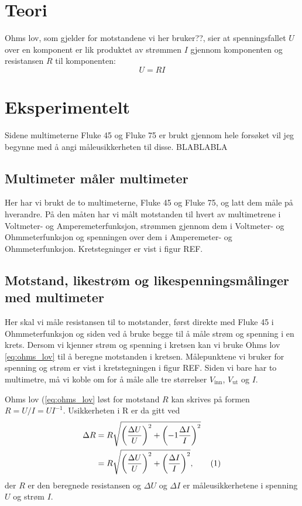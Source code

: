 \documentclass[reprint, english,notitlepage]{revtex4-1}  %
\newcommand\numberthis{\addtocounter{equation}{1}\tag{\theequation}}
\begin{document}
\section{Teori}

Ohms lov, som gjelder for motstandene vi her bruker??, sier at spenningsfallet $U$ over en komponent er lik produktet av strømmen $I$ gjennom komponenten og resistansen $R$ til komponenten:
\begin{equation}
  \label{eq:ohms_lov}
  U = R I
\end{equation}



\section{Eksperimentelt}

Sidene multimeterne Fluke 45 og Fluke 75 er brukt gjennom hele forsøket vil jeg begynne med å angi måleusikkerheten til disse. BLABLABLA

\subsection{Multimeter måler multimeter}
Her har vi brukt de to multimeterne, Fluke 45 og Fluke 75, og latt dem måle på hverandre. På den måten har vi målt motstanden til hvert av multimetrene i Voltmeter- og Amperemeterfunksjon, strømmen gjennom dem i Voltmeter- og Ohmmeterfunksjon og spenningen over dem i Amperemeter- og Ohmmeterfunksjon. Kretstegninger er vist i figur REF.

\subsection{Motstand, likestrøm og likespenningsmålinger med multimeter}
Her skal vi måle resistansen til to motstander, først direkte med Fluke 45 i Ohmmeterfunksjon og siden ved å bruke begge til å måle strøm og spenning i en krets. Dersom vi kjenner strøm og spenning i kretsen kan vi bruke Ohms lov \ref{eq:ohms_lov} til å beregne motstanden i kretsen. Målepunktene vi bruker for spenning og strøm er vist i kretstegningen i figur REF. Siden vi bare har to multimetre, må vi koble om for å måle alle tre størrelser $V_{\text{inn}}$, $V_{\text{ut}}$ og $I$.

Ohms lov (\ref{eq:ohms_lov} løst for motstand $R$ kan skrives på formen $R = U/I = U I^{-1}$. Usikkerheten i R er da gitt ved
\begin{align*}
  \Delta R &= R \sqrt{\left( \frac{\Delta U}{U} \right) ^2 + \left( -1 \frac{\Delta I}{I} \right) ^2} \\
  &= R \sqrt{\left( \frac{\Delta U}{U} \right) ^2 + \left( \frac{\Delta I}{I} \right) ^2}, \numberthis \label{eq:usikkerhet_R}
\end{align*}
der $R$ er den beregnede resistansen og $\Delta U$ og $\Delta I$ er måleusikkerhetene i spenning $U$ og strøm $I$.
\end{document}
